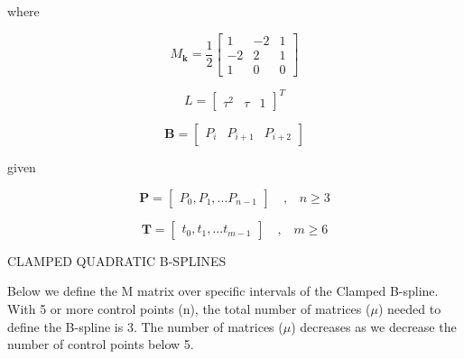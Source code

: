\documentclass{article}
\begin{document}
    where 
    
    \begin{equation}
    M_{\textbf{k}} = \frac{1}{2}\begin{bmatrix}
                        1 & -2 & 1 \\
                       -2 &  2 & 1 \\
                        1 &  0 & 0
                    \end{bmatrix}
    \end{equation}
    
    \begin{equation}
        L = \begin{bmatrix} \tau^{2} & \tau & 1 \end{bmatrix}^{T}
    \end{equation}
    
    \begin{equation}
        \textbf{B} = \begin{bmatrix} P_{i} & P_{i+1} & P_{i+2}\end{bmatrix}
    \end{equation}
    
    given
    
    \begin{equation}
    \textbf{P} = \begin{bmatrix} P_0, P_1, ... P_{n-1} \end{bmatrix} \quad \text{,} \quad n \geq 3
    \end{equation}
    
    \begin{equation}
        \textbf{T} = \begin{bmatrix} t_0, t_1, ... t_{m-1} \end{bmatrix} \quad \text{,} \quad m \geq 6
    \end{equation}
    
    
\noindent CLAMPED QUADRATIC B-SPLINES
\hfill \break

    Below we define the M matrix over specific intervals of the Clamped B-spline. With 5 or more control points (n), the total number of matrices (\(\mu\)) needed to define the B-spline is 3. The number of matrices (\(\mu\)) decreases as we decrease the number of control points below 5.
    
\end{document}
